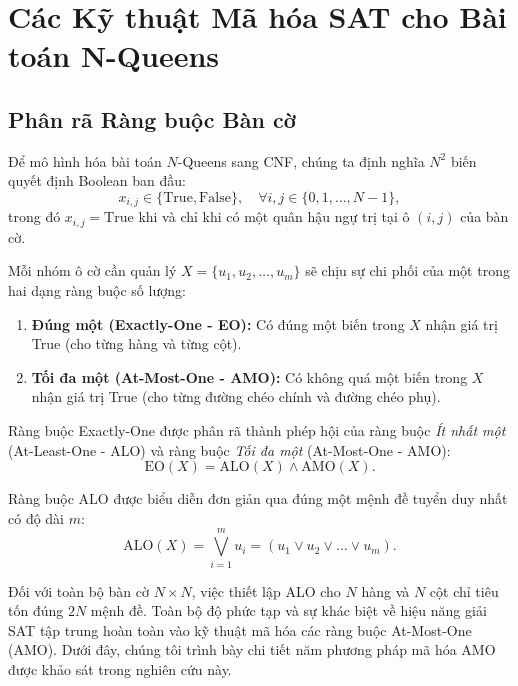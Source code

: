 \documentclass[a4paper,fleqn]{cas-sc}
\begin{document}
\section{Các Kỹ thuật Mã hóa SAT cho Bài toán N-Queens}
\label{sec:sat_encodings}

\subsection{Phân rã Ràng buộc Bàn cờ}
Để mô hình hóa bài toán $N$-Queens sang CNF, chúng ta định nghĩa $N^2$ biến quyết định Boolean ban đầu:
\begin{equation}
    x_{i,j} \in \{\text{True}, \text{False}\}, \quad \forall i, j \in \{0, 1, \dots, N-1\},
\end{equation}
trong đó $x_{i,j} = \text{True}$ khi và chỉ khi có một quân hậu ngự trị tại ô $(i, j)$ của bàn cờ.

Mỗi nhóm ô cờ cần quản lý $X = \{u_1, u_2, \dots, u_m\}$ sẽ chịu sự chi phối của một trong hai dạng ràng buộc số lượng:
\begin{enumerate}
    \item \textbf{Đúng một (Exactly-One - EO):} Có đúng một biến trong $X$ nhận giá trị True (cho từng hàng và từng cột).
    \item \textbf{Tối đa một (At-Most-One - AMO):} Có không quá một biến trong $X$ nhận giá trị True (cho từng đường chéo chính và đường chéo phụ).
\end{enumerate}

Ràng buộc Exactly-One được phân rã thành phép hội của ràng buộc \textit{Ít nhất một} (At-Least-One - ALO) và ràng buộc \textit{Tối đa một} (At-Most-One - AMO):
\begin{equation}
    \text{EO}(X) = \text{ALO}(X) \land \text{AMO}(X).
\end{equation}

Ràng buộc ALO được biểu diễn đơn giản qua đúng một mệnh đề tuyển duy nhất có độ dài $m$:
\begin{equation}
    \text{ALO}(X) = \bigvee_{i=1}^m u_i = (u_1 \lor u_2 \lor \dots \lor u_m).
\end{equation}

Đối với toàn bộ bàn cờ $N \times N$, việc thiết lập ALO cho $N$ hàng và $N$ cột chỉ tiêu tốn đúng $2N$ mệnh đề. Toàn bộ độ phức tạp và sự khác biệt về hiệu năng giải SAT tập trung hoàn toàn vào kỹ thuật mã hóa các ràng buộc At-Most-One (AMO). Dưới đây, chúng tôi trình bày chi tiết năm phương pháp mã hóa AMO được khảo sát trong nghiên cứu này.
\end{document}
